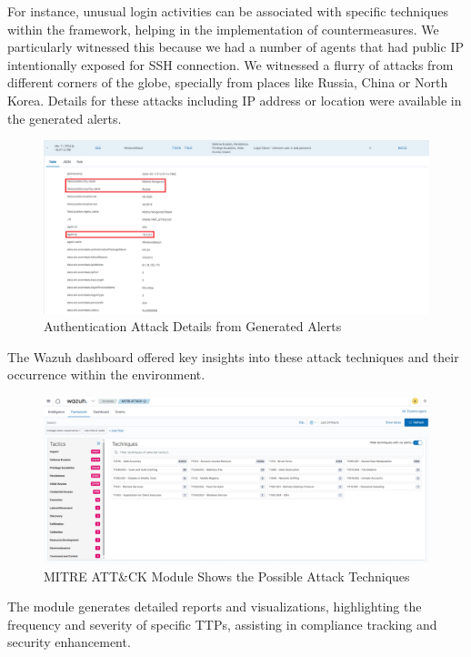 For instance, unusual login activities can be associated with specific techniques within the framework, helping in the implementation of countermeasures. We particularly witnessed this because we had a number of agents that had public IP intentionally exposed for SSH connection. We witnessed a flurry of attacks from different corners of the globe, specially from places like Russia, China or North Korea. Details for these attacks including IP address or location were available in the generated alerts.
\begin{figure}[H]
    \centering
    \includegraphics[width=\textwidth]{images/threat-hunting/auth-attack.png}
    \caption{Authentication Attack Details from Generated Alerts}
    \label{fig:mitre-attack}
\end{figure}
The Wazuh dashboard offered key insights into these attack techniques and their occurrence within the environment.

\begin{figure}[H]
    \centering
    \includegraphics[width=\textwidth]{images/threat-hunting/mitre-techniques.png}
    \caption{MITRE ATT\&CK Module Shows the Possible Attack Techniques}
    \label{fig:mitre-attack-techniques}
\end{figure}

The module generates detailed reports and visualizations, highlighting the frequency and severity of specific TTPs, assisting in compliance tracking and security enhancement.

